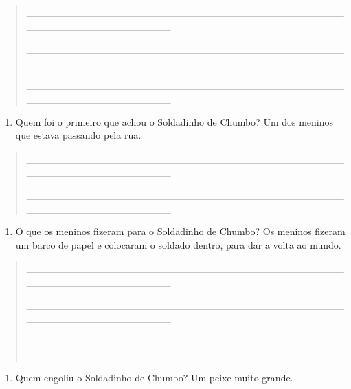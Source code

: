 \begin{itemize}
{{{\begin{itemize}
\begin{itemize}
\begin{itemize}
\begin{quote}
\_\_\_\_\_\_\_\_\_\_\_\_\_\_\_\_\_\_\_\_\_\_\_\_\_\_\_\_\_\_\_\_\_\_\_\_\_\_\_\_\_\_\_\_\_\_\_\_\_\_\_\_\_\_\_\_\_\_\_\_\_\_\_\_

\_\_\_\_\_\_\_\_\_\_\_\_\_\_\_\_\_\_\_\_\_\_\_\_\_\_\_\_\_\_\_\_\_\_\_\_\_\_\_\_\_\_\_\_\_\_\_\_\_\_\_\_\_\_\_\_\_\_\_\_\_\_\_\_

\_\_\_\_\_\_\_\_\_\_\_\_\_\_\_\_\_\_\_\_\_\_\_\_\_\_\_\_\_\_\_\_\_\_\_\_\_\_\_\_\_\_\_\_\_\_\_\_\_\_\_\_\_\_\_\_\_\_\_\_\_\_\_\_
\end{quote}

\begin{enumerate}
\def\labelenumi{\alph{enumi})}
\item
  Quem foi o primeiro que achou o Soldadinho de Chumbo? Um dos meninos
  que estava passando pela rua.
\end{enumerate}

\begin{quote}
\_\_\_\_\_\_\_\_\_\_\_\_\_\_\_\_\_\_\_\_\_\_\_\_\_\_\_\_\_\_\_\_\_\_\_\_\_\_\_\_\_\_\_\_\_\_\_\_\_\_\_\_\_\_\_\_\_\_\_\_\_\_\_\_

\_\_\_\_\_\_\_\_\_\_\_\_\_\_\_\_\_\_\_\_\_\_\_\_\_\_\_\_\_\_\_\_\_\_\_\_\_\_\_\_\_\_\_\_\_\_\_\_\_\_\_\_\_\_\_\_\_\_\_\_\_\_\_\_
\end{quote}

\begin{enumerate}
\def\labelenumi{\alph{enumi})}
\item
  O que os meninos fizeram para o Soldadinho de Chumbo? Os meninos
  fizeram um barco de papel e colocaram o soldado dentro, para dar a
  volta ao mundo.
\end{enumerate}

\begin{quote}
\_\_\_\_\_\_\_\_\_\_\_\_\_\_\_\_\_\_\_\_\_\_\_\_\_\_\_\_\_\_\_\_\_\_\_\_\_\_\_\_\_\_\_\_\_\_\_\_\_\_\_\_\_\_\_\_\_\_\_\_\_\_\_\_

\_\_\_\_\_\_\_\_\_\_\_\_\_\_\_\_\_\_\_\_\_\_\_\_\_\_\_\_\_\_\_\_\_\_\_\_\_\_\_\_\_\_\_\_\_\_\_\_\_\_\_\_\_\_\_\_\_\_\_\_\_\_\_\_

\_\_\_\_\_\_\_\_\_\_\_\_\_\_\_\_\_\_\_\_\_\_\_\_\_\_\_\_\_\_\_\_\_\_\_\_\_\_\_\_\_\_\_\_\_\_\_\_\_\_\_\_\_\_\_\_\_\_\_\_\_\_\_\_
\end{quote}

\begin{enumerate}
\def\labelenumi{\alph{enumi})}
\item
  Quem engoliu o Soldadinho de Chumbo? Um peixe muito grande.
\end{enumerate}


\end{itemize}
\end{itemize}
\end{itemize}}}}
\end{itemize}
